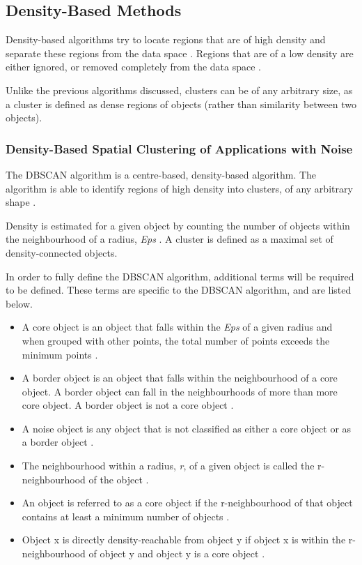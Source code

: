 \subsection{Density-Based Methods}
Density-based algorithms try to locate regions that are of high density and 
separate these regions from the data space \citep{tan05,han06}. Regions that 
are of a low density are either ignored, or removed completely from the data 
space \citep{han06}.

Unlike the previous algorithms discussed, clusters can be of any arbitrary 
size, as a cluster is defined as dense regions of objects (rather than 
similarity between two objects).

\subsubsection{Density-Based Spatial Clustering of Applications with Noise}
\label{sec:DBSCAN}
The DBSCAN algorithm is a centre-based, density-based algorithm. The algorithm
is able to identify regions of high density into clusters, of any arbitrary 
shape \citep{han06}.

Density is estimated for a given object by counting the number of objects 
within the neighbourhood of a radius, {\em Eps} \citep{tan05}. A cluster is 
defined as a maximal set of density-connected objects. 

In order to fully define the DBSCAN algorithm, additional terms will be 
required to be defined. These terms are specific to the DBSCAN algorithm, and 
are listed below.

\begin{itemize}
  \item A core object is an object that falls within the {\em Eps} of a given 
        radius and when grouped with other points, the total number of points 
        exceeds the minimum points \citep{han06}.
  \item A border object is an object that falls within the neighbourhood of a 
        core object. A border object can fall in the neighbourhoods of more than 
        more core object. A border object is not a core object \citep{han06}.
  \item A noise object is any object that is not classified as either a core 
        object or as a border object \citep{han06}.
  \item The neighbourhood within a radius, {\em r}, of a given object is called 
        the r-neighbourhood of the object \citep{tan05}.
  \item An object is referred to as a core object if the r-neighbourhood of that 
        object contains at least a minimum number of objects \citep{tan05}.
  \item Object x is directly density-reachable from object y if object x is 
        within the r-neighbourhood of object y and object y is a core object
        \citep{tan05}.
\end{itemize}

